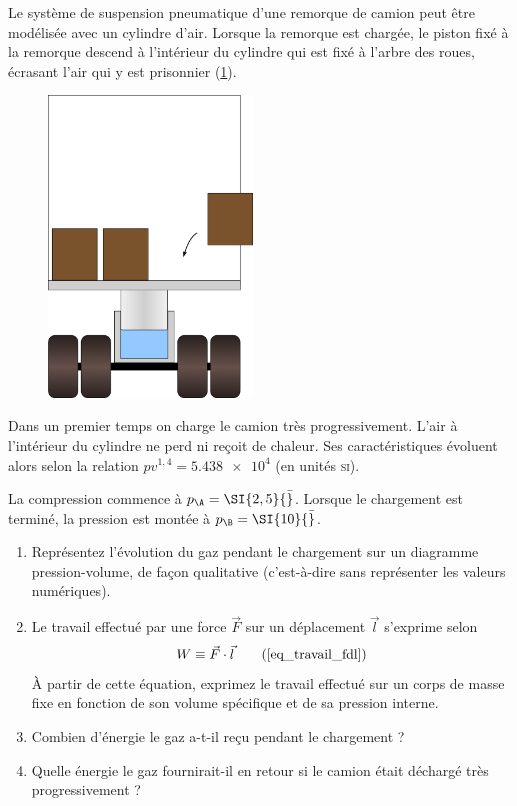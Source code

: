 	Le système de suspension pneumatique d’une remorque de camion peut être modélisée avec un cylindre d’air. Lorsque la remorque est chargée, le piston fixé à la remorque descend à l’intérieur du cylindre qui est fixé à l’arbre des roues, écrasant l’air qui y est prisonnier (\cref{fig_camion}).

	\begin{figure}
	\begin{center}
		\includegraphics[height=8cm]{images/piston_camion.png}
	\end{center}
	\label{fig_camion}
	\end{figure}
	
	Dans un premier temps on charge le camion très progressivement. L’air à l’intérieur du cylindre ne perd ni reçoit de chaleur. Ses caractéristiques évoluent alors selon la relation $p v^{1,4} = \num{5,438e4}$ (en unités \textsc{si}).
	
	La compression commence à $p_\A = \SI{2,5}{\bar}$. Lorsque le chargement est terminé, la pression est montée à $p_\B = \SI{10}{\bar}$. 
	
	\begin{enumerate}
		\item Représentez l’évolution du gaz pendant le chargement sur un diagramme pression-volume, de façon qualitative (c’est-à-dire sans représenter les valeurs numériques).
		\item Le travail effectué par une force $\vec F$ sur un déplacement $\vec l$ s’exprime selon
			\begin{equation}
				W \equiv \vec F \cdot \vec l 	\tag{\ref{eq_travail_fdl}}
			\end{equation}
			À partir de cette équation, exprimez le travail effectué sur un corps de masse fixe en fonction de son volume spécifique et de sa pression interne.
		\item Combien d’énergie le gaz a-t-il reçu pendant le chargement ?
		\item Quelle énergie le gaz fournirait-il en retour si le camion était déchargé très progressivement ?
	\end{enumerate}
	
